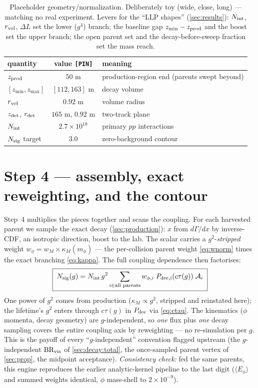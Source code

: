 \documentclass[11pt]{article}
\newcommand{\mphi}{m_\phi}
\begin{document}
\begin{table}[h]
\centering\footnotesize
\begin{tabular}{lcl}
\toprule
quantity & value \texttt{[PIN]} & meaning \\
\midrule
$z_{\rm prod}$ & $50$ m & production-region end (parents swept beyond) \\
$[z_{\min},z_{\max}]$ & $[112,163]$ m & decay volume \\
$r_{\rm vol}$ & $0.92$ m & volume radius \\
$z_{\rm det}$, $r_{\rm det}$ & $165$ m, $0.92$ m & two-track plane \\
$N_{\rm int}$ & $2.7\times10^{18}$ & primary $pp$ interactions \\
$N_{\rm sig}$ target & $3.0$ & zero-background contour \\
\bottomrule
\end{tabular}
\caption{Placeholder geometry/normalization. Deliberately toy (wide, close,
long) --- matching no real experiment. Levers for the ``LLP shapes''
(\cref{sec:results}): $N_{\rm int}$, $r_{\rm vol}$, $\Delta L$ set the lower
($g^4$) branch; the baseline gap $z_{\min}-z_{\rm prod}$ and the boost set the
upper branch; the open parent set and the decay-before-sweep fraction set the
mass reach.}
\label{tab:geom}
\end{table}

\section{Step 4 --- assembly, exact reweighting, and the contour}
\label{sec:assembly}\label{sec:reweight}

Step~4 multiplies the pieces together and scans the coupling. For each harvested
parent we sample the exact decay (\cref{sec:production}): $x$ from $d\Gamma/dx$ by
inverse-CDF, an isotropic direction, boost to the lab. The scalar carries a
$g^2$-\emph{stripped} weight $w_\phi=w_M\times\kappa_M(\mphi)$ --- the
per-collision parent weight \cref{eq:wnorm} times the exact branching
\cref{eq:kappa}. The full coupling dependence then factorises:
\begin{equation}
\boxed{\;N_{\rm sig}(g)
= N_{\rm int}\,g^2\sum_{i\in\text{all parents}} w_{\phi,i}\;
P_{\rm dec,i}(c\tau(g))\;\mathcal{A}_i\;}
\label{eq:reweight}
\end{equation}
One power of $g^2$ comes from production ($\kappa_M\propto g^2$, stripped and
reinstated here); the lifetime's $g^2$ enters through $c\tau(g)$ in $P_{\rm dec}$
via \cref{eq:ctau}. The kinematics ($\phi$ momenta, decay geometry) are
$g$-independent, so \emph{one} flux plus \emph{one} decay sampling covers the
entire coupling axis by reweighting --- no re-simulation per $g$. This is the
payoff of every ``$g$-independent'' convention flagged upstream (the
$g$-independent $\mathrm{BR}_{\rm vis}$ of \cref{sec:decay:total}, the
once-sampled parent vertex of \cref{sec:prop}, the midpoint acceptance).
\emph{Consistency check:} fed the same parents, this engine reproduces the
earlier analytic-kernel pipeline to the last digit ($\langle E_\phi\rangle$ and
summed weights identical, $\phi$ mass-shell to $2\times10^{-9}$).
\end{document}
